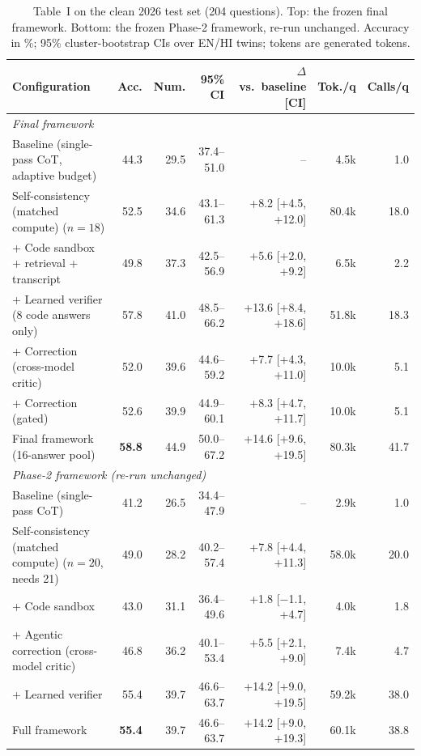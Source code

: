 \begin{table}[!t]
\centering
\footnotesize
\caption{Table~I on the clean 2026 test set (204 questions). Top: the frozen final framework. Bottom: the frozen Phase-2 framework, re-run unchanged. Accuracy in \%; 95\% cluster-bootstrap CIs over EN/HI twins; tokens are generated tokens.}
\label{tab:t26}
\setlength{\tabcolsep}{3.5pt}
\begin{tabular}{lrrrrrr}
\toprule
Configuration & Acc. & Num. & 95\% CI & $\Delta$ vs.\ baseline [CI] & Tok./q & Calls/q \\
\midrule
\multicolumn{7}{l}{\emph{Final framework}} \\
Baseline (single-pass CoT, adaptive budget) & 44.3 & 29.5 & 37.4--51.0 & -- & 4.5k & 1.0 \\
Self-consistency (matched compute) ($n{=}18$) & 52.5 & 34.6 & 43.1--61.3 & +8.2 [+4.5, +12.0] & 80.4k & 18.0 \\
+ Code sandbox + retrieval + transcript & 49.8 & 37.3 & 42.5--56.9 & +5.6 [+2.0, +9.2] & 6.5k & 2.2 \\
+ Learned verifier (8 code answers only) & 57.8 & 41.0 & 48.5--66.2 & +13.6 [+8.4, +18.6] & 51.8k & 18.3 \\
+ Correction (cross-model critic) & 52.0 & 39.6 & 44.6--59.2 & +7.7 [+4.3, +11.0] & 10.0k & 5.1 \\
+ Correction (gated) & 52.6 & 39.9 & 44.9--60.1 & +8.3 [+4.7, +11.7] & 10.0k & 5.1 \\
Final framework (16-answer pool) & \textbf{58.8} & 44.9 & 50.0--67.2 & +14.6 [+9.6, +19.5] & 80.3k & 41.7 \\
\midrule
\multicolumn{7}{l}{\emph{Phase-2 framework (re-run unchanged)}} \\
Baseline (single-pass CoT) & 41.2 & 26.5 & 34.4--47.9 & -- & 2.9k & 1.0 \\
Self-consistency (matched compute) ($n{=}20$, needs 21) & 49.0 & 28.2 & 40.2--57.4 & +7.8 [+4.4, +11.3] & 58.0k & 20.0 \\
+ Code sandbox & 43.0 & 31.1 & 36.4--49.6 & +1.8 [$-$1.1, +4.7] & 4.0k & 1.8 \\
+ Agentic correction (cross-model critic) & 46.8 & 36.2 & 40.1--53.4 & +5.5 [+2.1, +9.0] & 7.4k & 4.7 \\
+ Learned verifier & 55.4 & 39.7 & 46.6--63.7 & +14.2 [+9.0, +19.5] & 59.2k & 38.0 \\
Full framework & \textbf{55.4} & 39.7 & 46.6--63.7 & +14.2 [+9.0, +19.3] & 60.1k & 38.8 \\
\bottomrule
\end{tabular}
\end{table}
